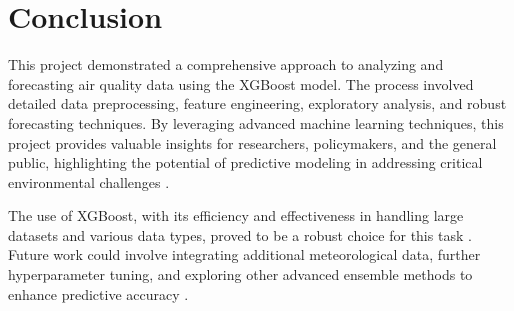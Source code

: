 \section{Conclusion}

This project demonstrated a comprehensive approach to analyzing and forecasting air quality data using the XGBoost model. The process involved detailed data preprocessing, feature engineering, exploratory analysis, and robust forecasting techniques. By leveraging advanced machine learning techniques, this project provides valuable insights for researchers, policymakers, and the general public, highlighting the potential of predictive modeling in addressing critical environmental challenges \cite{Goodfellow:2016}.

The use of XGBoost, with its efficiency and effectiveness in handling large datasets and various data types, proved to be a robust choice for this task \cite{Chen:2016}. Future work could involve integrating additional meteorological data, further hyperparameter tuning, and exploring other advanced ensemble methods to enhance predictive accuracy \cite{Aggarwal:2015}.